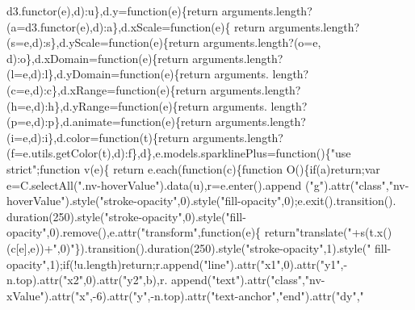 \begin{DoxyCode}
      d3.functor(e),d):u\},d.y=\textcolor{keyword}{function}(e)\{\textcolor{keywordflow}{return} arguments.length?(a=d3.functor(e),d):a\},d.xScale=\textcolor{keyword}{function}(e)\{\textcolor{keywordflow}{
      return} arguments.length?(s=e,d):s\},d.yScale=\textcolor{keyword}{function}(e)\{\textcolor{keywordflow}{return} arguments.length?(o=e,
      d):o\},d.xDomain=\textcolor{keyword}{function}(e)\{\textcolor{keywordflow}{return} arguments.length?(l=e,d):l\},d.yDomain=\textcolor{keyword}{function}(e)\{\textcolor{keywordflow}{return} arguments.
      length?(c=e,d):c\},d.xRange=\textcolor{keyword}{function}(e)\{\textcolor{keywordflow}{return} arguments.length?(h=e,d):h\},d.yRange=\textcolor{keyword}{function}(e)\{\textcolor{keywordflow}{return} arguments.
      length?(p=e,d):p\},d.animate=\textcolor{keyword}{function}(e)\{\textcolor{keywordflow}{return} arguments.length?(i=e,d):i\},d.color=\textcolor{keyword}{function}(t)\{\textcolor{keywordflow}{return} 
      arguments.length?(f=e.utils.getColor(t),d):f\},d\},e.models.sparklinePlus=\textcolor{keyword}{function}()\{\textcolor{stringliteral}{"use strict"};\textcolor{keyword}{function} v(e)\{\textcolor{keywordflow}{
      return} e.each(\textcolor{keyword}{function}(c)\{\textcolor{keyword}{function} O()\{\textcolor{keywordflow}{if}(a)\textcolor{keywordflow}{return};var e=C.selectAll(\textcolor{stringliteral}{".nv-hoverValue"}).data(u),r=e.enter().append
      (\textcolor{stringliteral}{"g"}).attr(\textcolor{stringliteral}{"class"},\textcolor{stringliteral}{"nv-hoverValue"}).style(\textcolor{stringliteral}{"stroke-opacity"},0).style(\textcolor{stringliteral}{"fill-opacity"},0);e.exit().transition().
      duration(250).style(\textcolor{stringliteral}{"stroke-opacity"},0).style(\textcolor{stringliteral}{"fill-opacity"},0).remove(),e.attr(\textcolor{stringliteral}{"transform"},\textcolor{keyword}{function}(e)\{\textcolor{keywordflow}{
      return}\textcolor{stringliteral}{"translate("}+s(t.x()(c[e],e))+\textcolor{stringliteral}{",0)"}\}).transition().duration(250).style(\textcolor{stringliteral}{"stroke-opacity"},1).style(\textcolor{stringliteral}{"
      fill-opacity"},1);\textcolor{keywordflow}{if}(!u.length)\textcolor{keywordflow}{return};r.append(\textcolor{stringliteral}{"line"}).attr(\textcolor{stringliteral}{"x1"},0).attr(\textcolor{stringliteral}{"y1"},-n.top).attr(\textcolor{stringliteral}{"x2"},0).attr(\textcolor{stringliteral}{"y2"},b),r.
      append(\textcolor{stringliteral}{"text"}).attr(\textcolor{stringliteral}{"class"},\textcolor{stringliteral}{"nv-xValue"}).attr(\textcolor{stringliteral}{"x"},-6).attr(\textcolor{stringliteral}{"y"},-n.top).attr(\textcolor{stringliteral}{"text-anchor"},\textcolor{stringliteral}{"end"}).attr(\textcolor{stringliteral}{"dy"},\textcolor{stringliteral}{"
}
\end{DoxyCode}
